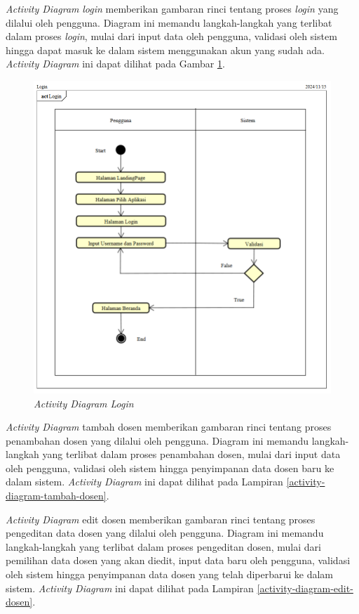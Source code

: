 \textit{Activity Diagram} \textit{login} memberikan gambaran rinci tentang proses \textit{login} yang dilalui oleh pengguna. Diagram ini memandu langkah-langkah yang terlibat dalam proses \textit{login}, mulai dari input data oleh pengguna, validasi oleh sistem hingga dapat masuk ke dalam sistem menggunakan akun yang sudah ada. \textit{Activity Diagram} ini dapat dilihat pada Gambar \ref{activity-diagram-login}.

\begin{figure}
	\centering
	\includegraphics[width=1\textwidth]{konten/gambar/activity-diagram/login.png}
	\caption{\textit{Activity Diagram Login}}
	\label{activity-diagram-login}
\end{figure}

\textit{Activity Diagram} tambah dosen memberikan gambaran rinci tentang proses penambahan dosen yang dilalui oleh pengguna. Diagram ini memandu langkah-langkah yang terlibat dalam proses penambahan dosen, mulai dari input data oleh pengguna, validasi oleh sistem hingga penyimpanan data dosen baru ke dalam sistem. \textit{Activity Diagram} ini dapat dilihat pada Lampiran \ref{activity-diagram-tambah-dosen}.

\textit{Activity Diagram} edit dosen memberikan gambaran rinci tentang proses pengeditan data dosen yang dilalui oleh pengguna. Diagram ini memandu langkah-langkah yang terlibat dalam proses pengeditan dosen, mulai dari pemilihan data dosen yang akan diedit, input data baru oleh pengguna, validasi oleh sistem hingga penyimpanan data dosen yang telah diperbarui ke dalam sistem. \textit{Activity Diagram} ini dapat dilihat pada Lampiran \ref{activity-diagram-edit-dosen}.

